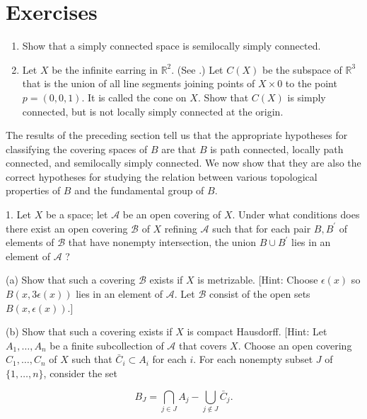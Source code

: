 \section*{Exercises}
\begin{enumerate}[itemsep=0.4em, parsep=0pt, topsep=0pt, partopsep=0pt, leftmargin=*, label=\arabic*., ref=\arabic*]
\item Show that a simply connected space is semilocally simply connected.
\item Let \(X\) be the infinite earring in \(\mathbb{R}^{2}\). (See .) Let \(C( X)\) be the subspace of \(\mathbb{R}^{3}\) that is the union of all line segments joining points of \(X \times 0\) to the point \(p = ( {0,0,1})\). It is called the cone on \(X\). Show that \(C( X)\) is simply connected, but is not locally simply connected at the origin.
\end{enumerate}

The results of the preceding section tell us that the appropriate hypotheses for classifying the covering spaces of \(B\) are that \(B\) is path connected, locally path connected, and semilocally simply connected. We now show that they are also the correct hypotheses for studying the relation between various topological properties of \(B\) and the fundamental group of \(B\).

1. Let \(X\) be a space; let \(\mathcal{A}\) be an open covering of \(X\). Under what conditions does there exist an open covering \(\mathcal{B}\) of \(X\) refining \(\mathcal{A}\) such that for each pair \(B,B^{\prime }\) of elements of \(\mathcal{B}\) that have nonempty intersection, the union \(B \cup {B}^{\prime }\) lies in an element of \(\mathcal{A}\) ?

(a) Show that such a covering \(\mathcal{B}\) exists if \(X\) is metrizable. [Hint: Choose \(\epsilon (x)\) so \(B( {x,{3\epsilon }(x) })\) lies in an element of \(\mathcal{A}\). Let \(\mathcal{B}\) consist of the open sets \(B( {x,\epsilon (x) })\).]

(b) Show that such a covering exists if \(X\) is compact Hausdorff. [Hint: Let \(A_{1},\ldots ,A_{n}\) be a finite subcollection of \(\mathcal{A}\) that covers \(X\). Choose an open covering \(C_{1},\ldots ,C_{n}\) of \(X\) such that \(\bar{C}_{i} \subset {A}_{i}\) for each \(i\). For each nonempty subset \(J\) of \(\{ 1,\ldots, n\}\), consider the set

\[
B_{J} = \mathop{\bigcap }\limits_{{j \in J}}A_{j} - \mathop{\bigcup }\limits_{{j \notin J}}\bar{C}_{j}.
\]

